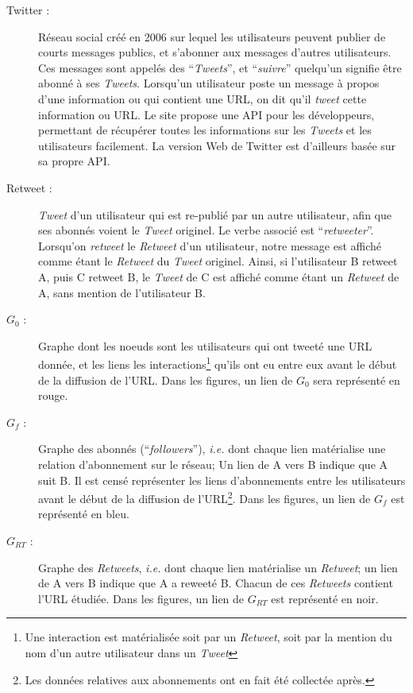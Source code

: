 \documentclass[]{article}
\begin{document}
\begin{description}
\item[Twitter :]
Réseau social créé en 2006 sur lequel les utilisateurs peuvent publier
de courts messages publics, et s'abonner aux messages d'autres
utilisateurs. Ces messages sont appelés des ``\emph{Tweets}'', et
``\emph{suivre}'' quelqu'un signifie être abonné à ses \emph{Tweets}.
Lorsqu'un utilisateur poste un message à propos d'une information ou qui
contient une URL, on dit qu'il \emph{tweet} cette information ou URL. Le
site propose une API pour les développeurs, permettant de récupérer
toutes les informations sur les \emph{Tweets} et les utilisateurs
facilement. La version Web de Twitter est d'ailleurs basée sur sa propre
API.

\item[Retweet :]
\emph{Tweet} d'un utilisateur qui est re-publié par un autre
utilisateur, afin que ses abonnés voient le \emph{Tweet} originel. Le
verbe associé est ``\emph{retweeter}''. Lorsqu'on \emph{retweet} le
\emph{Retweet} d'un utilisateur, notre message est affiché comme étant
le \emph{Retweet} du \emph{Tweet} originel. Ainsi, si l'utilisateur B
retweet A, puis C retweet B, le \emph{Tweet} de C est affiché comme
étant un \emph{Retweet} de A, sans mention de l'utilisateur B.

\item[$G_{0}$ :]
Graphe dont les noeuds sont les utilisateurs qui ont tweeté une URL
donnée, et les liens les interactions\footnote{Une interaction est
  matérialisée soit par un \emph{Retweet}, soit par la mention du nom
  d'un autre utilisateur dans un \emph{Tweet}} qu'ils ont eu entre eux
avant le début de la diffusion de l'URL. Dans les figures, un lien de
$G_{0}$ sera représenté en rouge.

\item[$G_{f}$ :]
Graphe des abonnés (``\emph{followers}''), \emph{i.e.} dont chaque lien
matérialise une relation d'abonnement sur le réseau; Un lien de A vers B
indique que A suit B. Il est censé représenter les liens d'abonnements
entre les utilisateurs avant le début de la diffusion de l'URL\footnote{Les
  données relatives aux abonnements ont en fait été collectée après.}.
Dans les figures, un lien de $G_{f}$ est représenté en bleu.

\item[$G_{RT}$ :]
Graphe des \emph{Retweets}, \emph{i.e.} dont chaque lien matérialise un
\emph{Retweet}; un lien de A vers B indique que A a reweeté B. Chacun de
ces \emph{Retweets} contient l'URL étudiée. Dans les figures, un lien de
$G_{RT}$ est représenté en noir.

\end{description}
\end{document}
